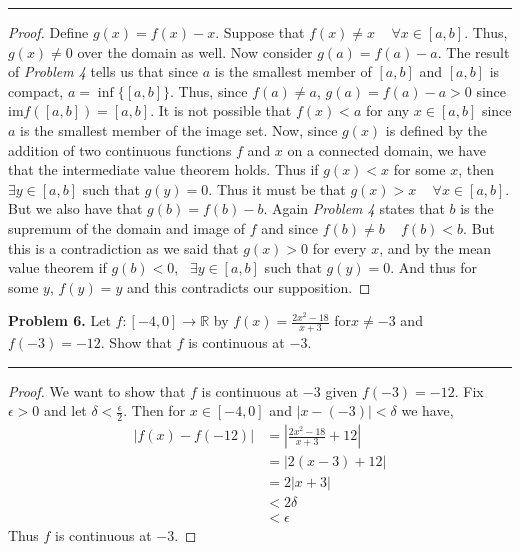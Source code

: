 \documentclass[leqno]{article}
\theoremstyle{nonumberplain}
\newtheorem{proof}{Proof}
\begin{document}
\noindent\rule[0.5ex]{\linewidth}{1pt}

\begin{proof}
	Define $g(x)=f(x)-x$.  Suppose that $f(x)\neq x$ ~ $\forall x \in [a,b]$.  Thus, $g(x)\neq 0$ over the domain as well.  Now consider $g(a)=f(a)-a$.  The result of \emph{Problem 4} tells us that since $a$ is the smallest member of $[a,b]$ and $[a,b]$ is compact, $a=\inf\{[a,b]\}$. Thus, since $f(a)\neq a$, $g(a)=f(a)-a>0$ since $\mathrm{im}f([a,b])=[a,b]$. It is not possible that $f(x)<a$ for any $x\in [a,b]$ since $a$ is the smallest member of the image set.  Now, since $g(x)$ is defined by the addition of two continuous functions $f$ and $x$ on a connected domain, we have that the intermediate value theorem holds.  Thus if $g(x)<x$ for some $x$, then $\exists y \in [a,b]$ such that $g(y)=0$.  Thus it must be that $g(x)>x$ ~ $\forall x \in [a,b]$.  But we also have that $g(b)=f(b)-b$.  Again \emph{Problem 4} states that $b$ is the supremum of the domain and image of $f$ and since $f(b)\neq b$ ~ $f(b)<b$.  But this is a contradiction as we said that $g(x)>0$ for every $x$, and by the mean value theorem if $g(b)<0$, ~$\exists y \in [a,b]$ such that $g(y)=0$.  And thus for some $y$, $f(y)=y$ and this contradicts our supposition.
\end{proof}


\pagebreak




\noindent\textbf{Problem 6.} Let $f \colon [-4,0] \to \mathbb{R}$ by $f(x)=\frac{2x^2 - 18}{x+3}$ for$x \neq -3$ and $f(-3) = -12$. Show that $f$ is continuous at $-3$. 

\noindent\rule[0.5ex]{\linewidth}{1pt}

\begin{proof}
	We want to show that $f$ is continuous at $-3$ given $f(-3)=-12$.  Fix $\epsilon > 0$ and let $\delta < \frac{\epsilon}{2}$.  Then for $x \in [-4,0]$ and $|x-(-3)|<\delta$ we have,
	\begin{align*}
		|f(x)-f(-12)|&=\left| \frac{2x^2 -18}{x+3} +12 \right|\\
		&= |2(x-3)+12|\\
		&= 2|x+3|\\
		&<2 \delta\\
		&< \epsilon
	\end{align*} 
	Thus $f$ is continuous at $-3$.
\end{proof}
\pagebreak
\end{document}
